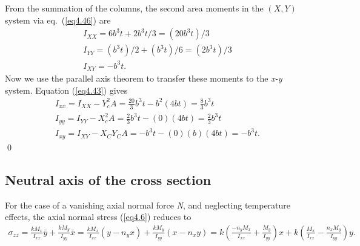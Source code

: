 \documentclass{AeroStructure-ERJohnson}
\begin{document}
\begin{example*}
From the summation of the columns, the second area moments in the $(X, Y)$ system via eq.~(\ref{eq4.46}) are
\begin{equation}\label{ex4.3b}
\begin{gathered}
I_{X X}=6 b^{3} t+2 b^{3} t/3=(20 b^{3} t)/3 \\
I_{Y Y}=(b^{3} t)/2+(b^{3} t)/6=(2 b^{3} t)/3 \\
I_{X Y}=-b^{3} t.
\end{gathered}
\end{equation}
Now we use the parallel axis theorem to transfer these moments to the \textit{x-y} system. Equation (\ref{eq4.43}) gives
\begin{align}
I_{x x}=I_{X X}-Y_{c}^{2} A=\frac{20}{3} b^{3} t-b^{2}(4 b t)=\frac{8}{3} b^{3} t\label{ex4.3c}\\
I_{y y}=I_{Y Y}-X_{c}^{2} A=\frac{2}{3} b^{3} t-(0)(4 b t)=\frac{2}{3} b^{3} t\label{ex4.3d}\\
I_{x y}=I_{X Y}-X_{C} Y_{C} A=-b^{3} t-(0)(b)(4 b t)=-b^{3} t.\label{ex4.3e}
\end{align}\hfill\qed
\end{example*}

\vspace*{-14pt}

\subsection{Neutral axis of the cross section}\label{sec4.3.4}\setcounter{equation}{47}

For the case of a vanishing axial normal force \textit{N}, and neglecting temperature effects, the axial normal stress (\ref{eq4.6}) reduces to
\begin{align}\label{eq4.48}
\sigma_{z z}=\frac{k M_{x}}{I_{x x}} \bar{y}+\frac{k M_{y}}{I_{y y}} \bar{x}=\frac{k M_{x}}{I_{x x}}\left(y-n_{y} x\right)+\frac{k M_{y}}{I_{y y}}\left(x-n_{x} y\right)=k\left(\frac{-n_{y} M_{x}}{I_{x x}}+\frac{M_{y}}{I_{y y}}\right) x+k\left(\frac{M_{x}}{I_{x x}}-\frac{n_{x} M_{y}}{I_{y y}}\right) y.
\end{align}
\vspace*{4pt}
\clearpage
\end{document}

